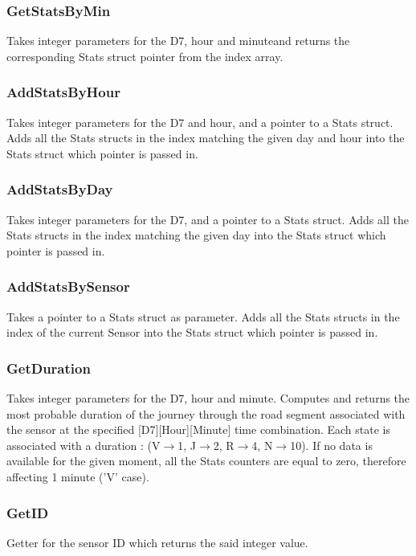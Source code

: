 \documentclass[10pt]{article}
\begin{document}
\subsubsection*{GetStatsByMin}
Takes integer parameters for the D7, hour and minute\footnotemark[1] and returns the corresponding Stats struct pointer from the index array.

\subsubsection*{AddStatsByHour}
Takes integer parameters for the D7 and hour\footnotemark[1], and a pointer to a Stats struct. Adds all the Stats structs in the index matching the given day and hour into the Stats struct which pointer is passed in.

\subsubsection*{AddStatsByDay}
Takes integer parameters for the D7\footnotemark[1], and a pointer to a Stats struct. Adds all the Stats structs in the index matching the given day into the Stats struct which pointer is passed in.

\subsubsection*{AddStatsBySensor}
Takes a pointer to a Stats struct as parameter. Adds all the Stats structs in the index of the current Sensor into the Stats struct which pointer is passed in.

\subsubsection*{GetDuration}
Takes integer parameters for the D7, hour and minute\footnotemark[1]. Computes and returns the most probable duration of the journey through the road segment associated with the sensor at the specified [D7][Hour][Minute] time combination. Each state is associated with a duration : (V$\to$1, J$\to$2, R$\to$4, N$\to$10). If no data is available for the given moment, all the Stats counters are equal to zero, therefore affecting 1 minute ('V' case).

\subsubsection*{GetID}
Getter for the sensor ID which returns the said integer value.
\end{document}
